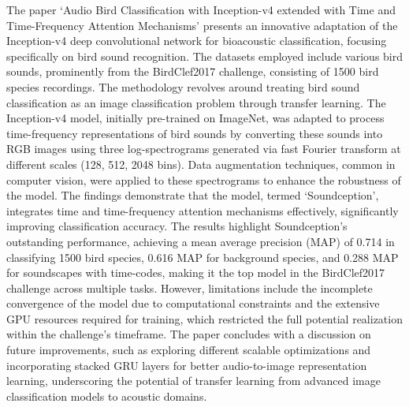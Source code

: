 The paper `Audio Bird Classification with Inception-v4 extended with Time and Time-Frequency Attention Mechanisms' presents an innovative adaptation of the Inception-v4 deep convolutional network for bioacoustic classification, focusing specifically on bird sound recognition. The datasets employed include various bird sounds, prominently from the BirdClef2017 challenge, consisting of 1500 bird species recordings. The methodology revolves around treating bird sound classification as an image classification problem through transfer learning. The Inception-v4 model, initially pre-trained on ImageNet, was adapted to process time-frequency representations of bird sounds by converting these sounds into RGB images using three log-spectrograms generated via fast Fourier transform at different scales (128, 512, 2048 bins). Data augmentation techniques, common in computer vision, were applied to these spectrograms to enhance the robustness of the model. The findings demonstrate that the model, termed `Soundception', integrates time and time-frequency attention mechanisms effectively, significantly improving classification accuracy. The results highlight Soundception's outstanding performance, achieving a mean average precision (MAP) of 0.714 in classifying 1500 bird species, 0.616 MAP for background species, and 0.288 MAP for soundscapes with time-codes, making it the top model in the BirdClef2017 challenge across multiple tasks. However, limitations include the incomplete convergence of the model due to computational constraints and the extensive GPU resources required for training, which restricted the full potential realization within the challenge's timeframe. The paper concludes with a discussion on future improvements, such as exploring different scalable optimizations and incorporating stacked GRU layers for better audio-to-image representation learning, underscoring the potential of transfer learning from advanced image classification models to acoustic domains.\cite{sevilla2017audio}\\

